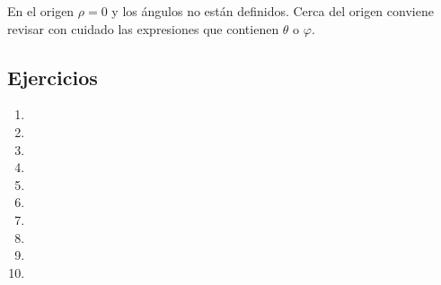 En el origen $\rho=0$ y los ángulos no están definidos. Cerca del origen conviene revisar con cuidado las expresiones que contienen $\theta$ o $\varphi$.

\subsection{Ejercicios}
\begin{enumerate}
    \item 
    \item 
    \item 
    \item 
    \item 
    \item 
    \item 
    \item 
    \item 
    \item 
\end{enumerate}
